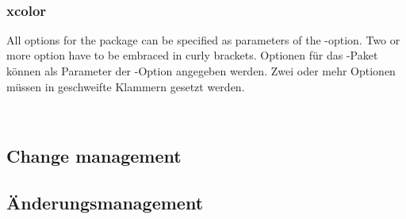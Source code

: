 \\

\subsubsection{xcolor}

\ifENGLISH
	All options for the  package can be specified as parameters of the -option.
	Two or more option have to be embraced in curly brackets.
\fi
	\ifGERMAN
		Optionen für das -Paket können als Parameter der -Option angegeben werden.
		Zwei oder mehr Optionen müssen in geschweifte Klammern gesetzt werden.
	\fi

\\

\ifENGLISH
	\subsection{Change management}
\fi
	\ifGERMAN
		\subsection{Änderungsmanagement}
	\fi

